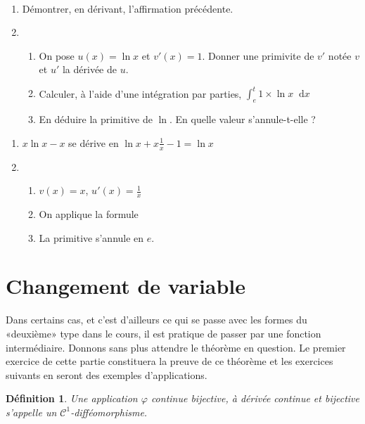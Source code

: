 \documentclass[11pt,a4paper,french]{article}
\newcommand{\diff}{\mathop{}\mathopen{}\mathrm{d}}
\theoremstyle{break}
\newtheorem{definition}{Définition}
\theoremstyle{plain}
\theoremstyle{nonumberplain}
\theoremstyle{nonumberbreak}
\begin{document}
\begin{question}
  ~\\[-5mm]
  \begin{enumerate}
    \item Démontrer, en dérivant, l'affirmation précédente.
    \item
      \begin{enumerate}
        \item On pose $u(x) = \ln x$ et $v'(x) = 1$. Donner une
          primivite de $v'$ notée $v$ et $u'$ la dérivée de $u$.
        \item Calculer, à l'aide d'une intégration par parties,
          $\int_e^t 1\times \ln x \diff x$
        \item En déduire la primitive de $\ln$. En quelle valeur
          s'annule-t-elle ?
      \end{enumerate}
  \end{enumerate}
\end{question}
\begin{solution}
  \begin{enumerate}
    \item $x\ln x - x $ se dérive en $\ln x + x\frac1x - 1 = \ln x$
    \item
      \begin{enumerate}
        \item $v(x) = x$, $u'(x) = \frac1x$
        \item On applique la formule
        \item La primitive s'annule en $e$.
      \end{enumerate}
  \end{enumerate}
\end{solution}

\section{Changement de variable}

Dans certains cas, et c'est d'ailleurs ce qui se passe avec les formes
du «deuxième» type dans le cours, il est pratique de passer par une
fonction intermédiaire. Donnons sans plus attendre le théorème en
question. Le premier exercice de cette partie constituera la preuve de
ce théorème et les exercices suivants en seront des exemples
d'applications.

\begin{definition}
  Une application $\varphi$ continue bijective, à dérivée continue et
  bijective s'appelle un $\mathcal{C}^1$-difféomorphisme.
\end{definition}
\end{document}
